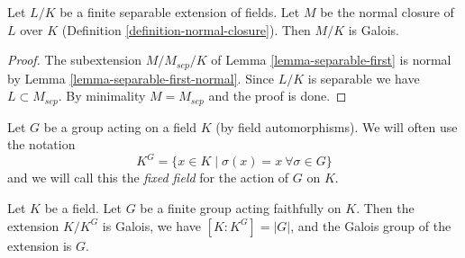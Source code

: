 \begin{lemma}
\label{lemma-normal-closure-galois}
Let $L/K$ be a finite separable extension of fields.
Let $M$ be the normal closure of $L$ over $K$
(Definition \ref{definition-normal-closure}).
Then $M/K$ is Galois.
\end{lemma}

\begin{proof}
The subextension $M/M_{sep}/K$ of Lemma \ref{lemma-separable-first}
is normal by Lemma \ref{lemma-separable-first-normal}.
Since $L/K$ is separable we have $L \subset M_{sep}$.
By minimality $M = M_{sep}$ and the proof is done.
\end{proof}

\noindent
Let $G$ be a group acting on a field $K$ (by field automorphisms).
We will often use the notation
$$
K^G = \{x \in K \mid \sigma(x) = x \ \forall \sigma \in G\}
$$
and we will call this the {\it fixed field} for the action of $G$ on $K$.

\begin{lemma}
\label{lemma-galois-over-fixed-field}
Let $K$ be a field. Let $G$ be a finite group acting faithfully on $K$.
Then the extension $K/K^G$ is Galois, we have $[K : K^G] = |G|$,
and the Galois group of the extension is $G$.
\end{lemma}

